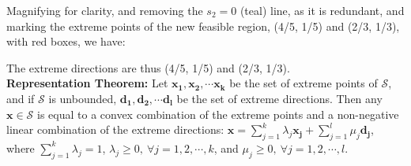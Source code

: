 \medskip Magnifying for clarity, and removing the $s_2=0$ (teal) line, as it is redundant, and marking the extreme points of the new feasible region, (4/5, 1/5) and (2/3, 1/3), with red boxes, we have:

\begin{center}   \end{center} 

The extreme directions are thus (4/5, 1/5) and (2/3, 1/3). \\

{\bf Representation Theorem:} Let  $\mathbf{x_1}, \mathbf{x_2},\cdots \mathbf{x_k}$ be the set of extreme points of $\mathcal{S}$, and if $\mathcal{S}$ is unbounded, $\mathbf{d_1}, \mathbf{d_2},\cdots \mathbf{d_l}$ be the set of extreme directions. Then any $\mathbf{x} \in \mathcal{S}$ is equal to a convex combination of the extreme points and a non-negative linear combination of the extreme directions: $\mathbf{x} = \sum_{j=1}^k \lambda_j \mathbf{x_j} + \sum_{j=1}^l \mu_j \mathbf{d_j}$, where $\sum_{j=1}^k \lambda_j = 1$, $\lambda_j \ge 0,~\forall  j=1,2,\cdots,k$, and $\mu_j \ge 0,~\forall j=1,2,\cdots,l$.

